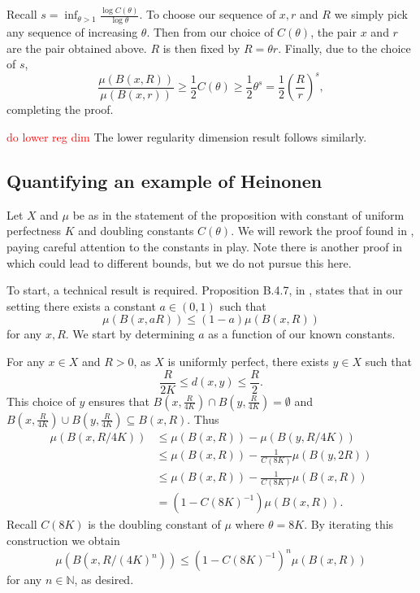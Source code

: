 Recall $s = \inf_{\theta > 1}\frac{\log C(\theta)}{\log \theta}$. To choose our sequence of $x,r$ and $R$ we simply pick any sequence of increasing $\theta$. Then from our choice of $C(\theta)$, the pair $x$ and $r$ are the pair obtained above. $R$ is then fixed by $R = \theta r$. Finally, due to the choice of $s$,
\[
\frac{\mu(B(x,R))}{\mu(B(x,r))} \ge \frac{1}{2} C(\theta)  \ge \frac{1}{2}\theta^s = \frac{1}{2}\left(\frac{R}{r} \right)^s,
\]
completing the proof.
	
\textcolor{red}{do lower reg dim}
The lower regularity dimension result follows similarly.





\subsection{Quantifying an example of Heinonen}



	Let $X$ and $\mu$ be as in the statement of the proposition with constant of uniform perfectness $K$ and doubling constants $C(\theta)$. We will rework the proof found in \cite[lemma 3.1]{anti1}, paying careful attention to the constants in play. Note there is another proof in \cite[Lemma 4.5]{eino-pablo} which could lead to different bounds, but we do not pursue this here.
	
	To start, a technical result is required. Proposition B.4.7, in \cite{gromov}, states that in our setting there exists a constant $a \in (0,1)$ such that 
	\[
	\mu(B(x,aR)) \le (1-a) \mu(B(x,R))
	\]
	for any $x,R$. We start by determining $a$ as a function of our known constants. 
	
	For any $x\in X$ and $R>0$, as $X$ is uniformly perfect, there exists $y \in X$ such that $$\frac{R}{2K} \le d(x,y) \le \frac{R}{2}.$$ This choice of $y$ ensures that $B(x,\frac{R}{4K}) \cap B(y,\frac{R}{4K}) = \emptyset $ and $B(x,\frac{R}{4K}) \cup B(y,\frac{R}{4K}) \subseteq B(x,R)$. Thus
	\begin{align*}
	\mu(B(x,R/4K)) &\le \mu(B(x,R)) - \mu(B(y, R/4K))\\
	& \le \mu(B(x,R)) - \frac{1}{C(8K)}\mu(B(y,2R)) \\
	& \le \mu(B(x,R)) - \frac{1}{C(8K)}\mu(B(x,R)) \\
	& = (1-C(8K)^{-1}) \mu(B(x,R)).
	\end{align*}
	Recall $C(8K)$ is the doubling constant of $\mu$ where $\theta = 8K$. By iterating this construction we obtain
	\[
	\mu(B(x,R/(4K)^n)) \le (1-C(8K)^{-1})^n \mu(B(x,R))
	\]
	for any $n\in \mathbb{N}$, as desired.
	
